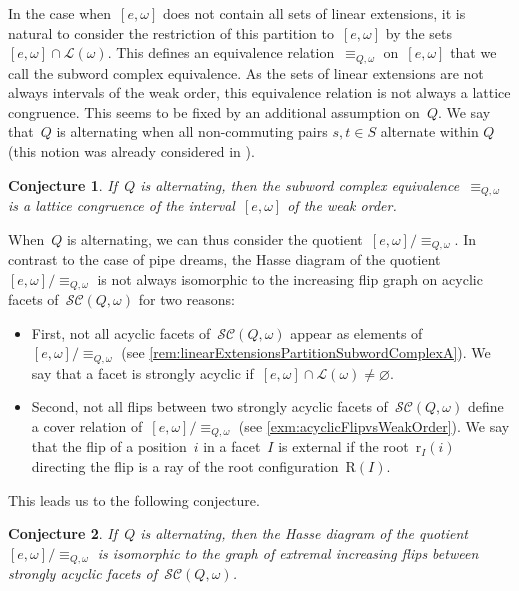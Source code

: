 \documentclass[reqno]{amsart}
\newtheorem{conjectureA}{Conjecture}
\theoremstyle{definition}
\newcommand{\linearExtensions}{\mathcal{L}} %
\newcommand{\subwordComplex}{\mathcal{SC}} %
\newcommand{\Roots}{\mathrm{R}} %
\newcommand{\rootFunction}[2]{\mathrm{r}_{#1}(#2)} %
\begin{document}
In the case when~$[e, \omega]$ does not contain all sets of linear extensions, it is natural to consider the restriction of this partition to~$[e, \omega]$ by the sets~$[e, \omega] \cap \linearExtensions(\omega)$.
This defines an equivalence relation~$\equiv_{Q, \omega}$ on~$[e, \omega]$ that we call the subword complex equivalence.
As the sets of linear extensions are not always intervals of the weak order, this equivalence relation is not always a lattice congruence.
This seems to be fixed by an additional assumption on~$Q$.
We say that~$Q$ is alternating when all non-commuting pairs $s, t\in S$ alternate within $Q$ (this notion was already considered in \cite{PilaudSantos-brickPolytope, CeballosLabbeStump}).

\begin{conjectureA}
\label{conj:A}
If~$Q$ is alternating, then the subword complex equivalence~$\equiv_{Q, \omega}$ is a lattice congruence of the interval~$[e, \omega]$ of the weak order.
\end{conjectureA}

When~$Q$ is alternating, we can thus consider the quotient~$[e, \omega]/{\equiv_{Q, \omega}}$.
In contrast to the case of pipe dreams, the Hasse diagram of the quotient~$[e, \omega]/{\equiv_{Q, \omega}}$ is not always isomorphic to the increasing flip graph on acyclic facets of~$\subwordComplex(Q, \omega)$ for two reasons:
\begin{itemize}
\item First, not all acyclic facets of~$\subwordComplex(Q, \omega)$ appear as elements of~$[e, \omega]/{\equiv_{Q, \omega}}$ (see \cref{rem:linearExtensionsPartitionSubwordComplexA}). We say that a facet is strongly acyclic if~$[e, \omega] \cap \linearExtensions(\omega) \ne \varnothing$.
\item Second, not all flips between two strongly acyclic facets of~$\subwordComplex(Q, \omega)$ define a cover relation of~$[e, \omega]/{\equiv_{Q, \omega}}$ (see \cref{exm:acyclicFlipvsWeakOrder}). We say that the flip of a position~$i$ in a facet~$I$ is external if the root~$\rootFunction{I}{i}$ directing the flip is a ray of the root configuration~$\Roots(I)$.
\end{itemize}
This leads us to the following conjecture.

\begin{conjectureA}
\label{conj:B}
If~$Q$ is alternating, then the Hasse diagram of the quotient~$[e, \omega]/\equiv_{Q, \omega}$ is isomorphic to the graph of extremal increasing flips between strongly acyclic facets of~$\subwordComplex(Q, \omega)$.
\end{conjectureA}
\end{document}
